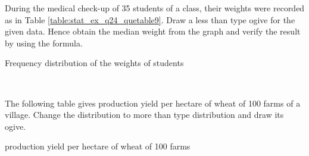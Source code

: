 
%
%
\item During the medical check-up of 35 students of a class, their weights were recorded as in Table
	\ref{table:stat_ex_q24_quetable9}. Draw a less than type ogive for the given data. Hence obtain the median weight from
the graph and verify the result by using the formula.
	\begin{table}[ht!]
\centering
    	
	\caption{Frequency distribution of the weights of students}
	\label{table:stat_ex_q24_quetable9}
	\end{table}
\\
\solution


%
%
\item The following table gives production yield per hectare of wheat of 100 farms of a village.
Change the distribution to more than type distribution and draw its ogive.
	\begin{table}[ht]
	\begin{center}
    	
	\caption{production yield per hectare of wheat of 100 farms}
	\label{table:stat_ex_q25_table4}
	\end{center}
	\end{table}
\\
\solution

